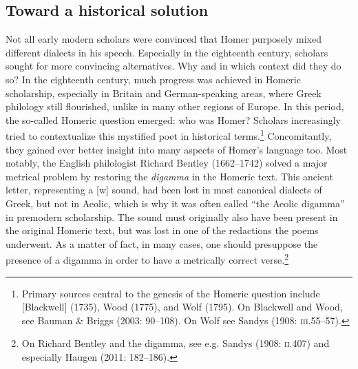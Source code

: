 \subsection{Toward a historical solution}
\hypertarget{Toc19704829}{}\begin{styleStandard}
Not all early modern scholars were convinced that Homer purposely mixed different dialects in his speech. Especially in the eighteenth century, scholars sought for more convincing alternatives. Why and in which context did they do so? In the eighteenth century, much progress was achieved in Homeric scholarship, especially in Britain and German-speaking areas, where Greek philology still flourished, unlike in many other regions of Europe. In this period, the so-called Homeric question emerged: who was Homer? Scholars increasingly tried to contextualize this mystified poet in historical terms.\footnote{ Primary sources central to the genesis of the Homeric question include [Blackwell] (1735), Wood (1775), and Wolf (1795). On Blackwell and Wood, see Bauman \& Briggs (2003: 90–108). On Wolf see Sandys (1908: \textsc{iii.}55–57).} Concomitantly, they gained ever better insight into many aspects of Homer’s language too. Most notably, the English philologist Richard Bentley (1662–1742) solved a major metrical problem by restoring the \textit{digamma} in the Homeric text. This ancient letter, representing a [w] sound, had been lost in most canonical dialects of Greek, but not in Aeolic, which is why it was often called “the Aeolic digamma” in premodern scholarship. The sound must originally also have been present in the original Homeric text, but was lost in one of the redactions the poems underwent. As a matter of fact, in many cases, one should presuppose the presence of a digamma in order to have a metrically correct verse.\footnote{ On Richard Bentley and the digamma, see e.g. Sandys (1908: \textsc{ii.}407) and especially Haugen (2011: 182–186).}
\end{styleStandard}

